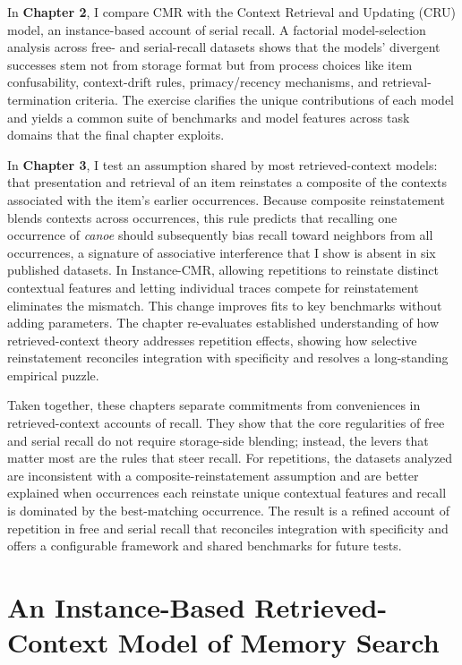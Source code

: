 \documentclass[
  letterpaper,
  11pt,
  english,
  singlespacing,
  headsepline]{MastersDoctoralThesis}
\begin{document}
In \textbf{Chapter 2}, I compare CMR with the Context Retrieval and
Updating (CRU) model, an instance-based account of serial recall. A
factorial model-selection analysis across free- and serial-recall
datasets shows that the models' divergent successes stem not from
storage format but from process choices like item confusability,
context-drift rules, primacy/recency mechanisms, and
retrieval-termination criteria. The exercise clarifies the unique
contributions of each model and yields a common suite of benchmarks and
model features across task domains that the final chapter exploits.

In \textbf{Chapter 3}, I test an assumption shared by most
retrieved-context models: that presentation and retrieval of an item
reinstates a composite of the contexts associated with the item's
earlier occurrences. Because composite reinstatement blends contexts
across occurrences, this rule predicts that recalling one occurrence of
\emph{canoe} should subsequently bias recall toward neighbors from all
occurrences, a signature of associative interference that I show is
absent in six published datasets. In Instance-CMR, allowing repetitions
to reinstate distinct contextual features and letting individual traces
compete for reinstatement eliminates the mismatch. This change improves
fits to key benchmarks without adding parameters. The chapter
re-evaluates established understanding of how retrieved-context theory
addresses repetition effects, showing how selective reinstatement
reconciles integration with specificity and resolves a long-standing
empirical puzzle.

Taken together, these chapters separate commitments from conveniences in
retrieved-context accounts of recall. They show that the core
regularities of free and serial recall do not require storage-side
blending; instead, the levers that matter most are the rules that steer
recall. For repetitions, the datasets analyzed are inconsistent with a
composite-reinstatement assumption and are better explained when
occurrences each reinstate unique contextual features and recall is
dominated by the best-matching occurrence. The result is a refined
account of repetition in free and serial recall that reconciles
integration with specificity and offers a configurable framework and
shared benchmarks for future tests.


\chapter{An Instance-Based Retrieved-Context Model of Memory
Search}\label{an-instance-based-retrieved-context-model-of-memory-search}
\end{document}
